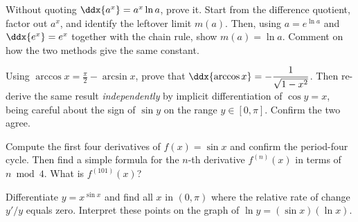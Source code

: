 \begin{exercise}
\label{ch12:exr-proof-ax}
Without quoting $\ddx{a^x}=a^x\ln a$, prove it. Start from the difference
quotient, factor out $a^x$, and identify the leftover limit $m(a)$. Then,
using $a = e^{\ln a}$ and $\ddx{e^x}=e^x$ together with the chain rule, show
$m(a)=\ln a$. Comment on how the two methods give the same constant.
\end{exercise}

\begin{exercise}
\label{ch12:exr-proof-arccos}
Using $\arccos x = \tfrac{\pi}{2} - \arcsin x$, prove that
$\ddx{\arccos x} = -\dfrac{1}{\sqrt{1-x^2}}$. Then re-derive the same result
\emph{independently} by implicit differentiation of $\cos y = x$, being
careful about the sign of $\sin y$ on the range $y\in[0,\pi]$. Confirm the
two agree.
\end{exercise}

\begin{exercise}
\label{ch12:exr-higher}
Compute the first four derivatives of $f(x)=\sin x$ and confirm the
period-four cycle. Then find a simple formula for the $n$-th derivative
$f^{(n)}(x)$ in terms of $n \bmod 4$. What is $f^{(101)}(x)$?
\end{exercise}

\begin{exercise}
\label{ch12:exr-challenge}
Differentiate $y = x^{\sin x}$ and find all $x$ in $(0,\pi)$ where the
relative rate of change $y'/y$ equals zero. Interpret these points on the
graph of $\ln y = (\sin x)(\ln x)$.
\end{exercise}
